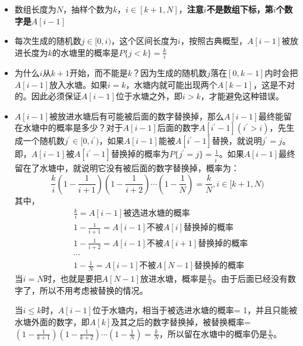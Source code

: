\documentclass{article}
\begin{document}
\begin{itemize}
	\item 数组长度为$N$，抽样个数为$k$，$i \in [k+1,N]$，\textbf{注意$i$不是数组下标，第$i$个数字是$A[i-1]$}
	\item 每次生成的随机数$j \in [0,i)$，这个区间长度为$i$，按照古典概型，$A[i-1]$被放进长度为$k$的水塘里的概率是$P\{j<k\}=\frac{k}{i}$
	\item 为什么$i$从$k+1$开始，而不能是$k$？因为生成的随机数$j$落在$[0,k-1]$内时会把$A[i-1]$放入水塘。如果$i=k$，水塘内就可能出现两个$A[k-1]$，这是不对的。因此必须保证$A[i-1]$位于水塘之外，即$i>k$，才能避免这种错误。
	\item $A[i-1]$被放进水塘后有可能被后面的数字替换掉，那么$A[i-1]$最终能留在水塘中的概率是多少？对于$A[i-1]$后面的数字$A[i^\prime-1] (i^\prime > i)$，先生成一个随机数$j^\prime \in [0,i^\prime)$，如果$A[i-1]$能被$A[i^\prime-1]$替换，就说明$j^\prime = j$。即，$A[i-1]$被$A[i^\prime-1]$替换掉的概率为$P\{j^\prime=j\}=\frac{1}{i^\prime}$。如果$A[i-1]$最终留在了水塘中，就说明它没有被后面的数字替换掉，概率为：
	\begin{equation*}
		\frac{k}{i}(1-\frac{1}{i+1})(1-\frac{1}{i+2})\cdots(1-\frac{1}{N})=\frac{k}{N}, i \in [k+1,N)
	\end{equation*}
	其中，
	\begin{align*}
		& \frac{k}{i} = A[i-1]\text{被选进水塘的概率} \\
		& 1-\frac{1}{i+1} = A[i-1]\text{不被}A[i]\text{替换掉的概率} \\
		& 1-\frac{1}{i+2} = A[i-1]\text{不被}A[i+1]\text{替换掉的概率} \\
		& \cdots \\
		& 1-\frac{1}{N} = A[i-1]\text{不被}A[N-1]\text{替换掉的概率}
	\end{align*}
	当$i=N$时，也就是要把$A[N-1]$放进水塘，概率是$\frac{k}{N}$。由于后面已经没有数字了，所以不用考虑被替换的情况。
	
	当$i\leqslant k$时，$A[i-1]$位于水塘内，相当于被选进水塘的概率= 1，并且只能被水塘外面的数字，即$A[k]$及其之后的数字替换掉，被替换概率= $(1-\frac{1}{k+1})(1-\frac{1}{k+2})\cdots(1-\frac{1}{N})=\frac{k}{N}$，所以留在水塘中的概率仍是$\frac{k}{N}$。
\end{itemize}
\end{document}
